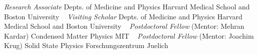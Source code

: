\textit{Research Associate} 
    \newline
    Depts. of Medicine and Physics
\newline
Harvard Medical School and Boston University
\newline
~
\Gap
{}
\textit{Visiting Scholar} 
    \newline
    Depts. of Medicine and Physics
\newline
Harvard Medical School and Boston University
\newline
~
\Gap
{}
\textit{Postdoctoral Fellow} (Mentor: Mehran Kardar)
    \newline
    Condensed Matter Physics
\newline
MIT
\newline
~
\Gap
{}
\textit{Postdoctoral Fellow} (Mentor: Joachim Krug)
    \newline
    Solid State Physics
\newline
Forschungszentrum Juelich
\newline
~
\Gap
\vspace*{0.2cm}
